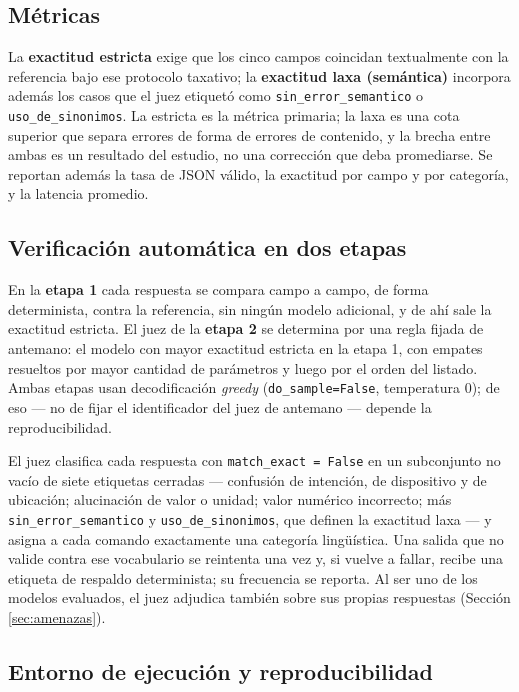 \subsection{Métricas}
\label{sec:metricas}

La \textbf{exactitud estricta} exige que los cinco campos coincidan
textualmente con la referencia bajo ese protocolo taxativo; la
\textbf{exactitud laxa (semántica)} incorpora además los casos que el juez
etiquetó como \texttt{sin\_error\_semantico} o \texttt{uso\_de\_sinonimos}. La
estricta es la métrica primaria; la laxa es una cota superior que separa
errores de forma de errores de contenido, y la brecha entre ambas es un
resultado del estudio, no una corrección que deba promediarse. Se reportan
además la tasa de JSON válido, la exactitud por campo y por categoría, y la
latencia promedio.

\subsection{Verificación automática en dos etapas}
\label{sec:dos-etapas}

En la \textbf{etapa 1} cada respuesta se compara campo a campo, de forma
determinista, contra la referencia, sin ningún modelo adicional, y de ahí
sale la exactitud estricta. El juez de la \textbf{etapa 2} se determina por
una regla fijada de antemano: el modelo con mayor exactitud estricta en la
etapa 1, con empates resueltos por mayor cantidad de parámetros y luego por
el orden del listado. Ambas etapas usan decodificación \emph{greedy}
(\texttt{do\_sample=False}, temperatura 0); de eso — no de fijar el
identificador del juez de antemano — depende la reproducibilidad.

El juez clasifica cada respuesta con \texttt{match\_exact = False} en un
subconjunto no vacío de siete etiquetas cerradas — confusión de intención, de
dispositivo y de ubicación; alucinación de valor o unidad; valor numérico
incorrecto; más \texttt{sin\_error\_semantico} y \texttt{uso\_de\_sinonimos},
que definen la exactitud laxa — y asigna a cada comando exactamente una
categoría lingüística. Una salida que no valide contra ese vocabulario se
reintenta una vez y, si vuelve a fallar, recibe una etiqueta de respaldo
determinista; su frecuencia se reporta. Al ser uno de los modelos evaluados,
el juez adjudica también sobre sus propias respuestas (Sección \ref{sec:amenazas}).

\subsection{Entorno de ejecución y reproducibilidad}
\label{sec:entorno-repro}

